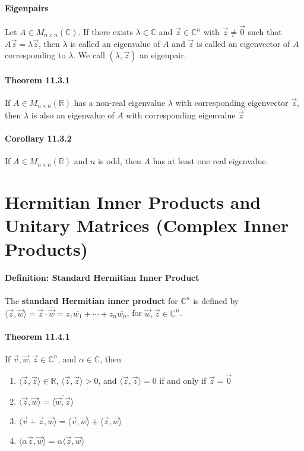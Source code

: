 \documentclass[10pt,letter]{article}
\begin{document}
\paragraph{Eigenpairs}
Let $A\in M_{n\times n}(\mathbb{C})$. If there exists $\lambda\in\mathbb{C}$ and $\vec{z}\in\mathbb{C}^n$ with $\vec{z}\neq\vec{0}$ such that $A\vec{z}=\lambda\vec{z}$, then $\lambda$ is called an eigenvalue of $A$ and $\vec{z}$ is called an eigenvector of $A$ corresponding to $\lambda$. We call $(\lambda,\vec{z})$ an eigenpair. 
\paragraph{Theorem 11.3.1}
If $A\in M_{n\times n}(\mathbb{R})$ has a non-real eigenvalue $\lambda$ with corresponding eigenvector $\vec{z}$, then $\overline{\lambda}$ is also an eigenvalue of $A$ with corresponding eigenvalue $\overline{\vec{z}}$
\paragraph{Corollary 11.3.2}
If $A\in M_{n\times n}(\mathbb{R})$ and $n$ is odd, then $A$ has at least one real eigenvalue.


\section*{Hermitian Inner Products and Unitary Matrices (Complex Inner Products)}
\paragraph{Definition: Standard Hermitian Inner Product}
The \textbf{standard Hermitian inner product} for $\mathbb{C}^n$ is defined by $\langle\vec{z},\vec{w}\rangle=\vec{z}\cdot\overline{\vec{w}}=z_1\overline{w_1}+\cdots+z_n\overline{w_n}$, for $\vec{w},\vec{z}\in\mathbb{C}^n$. 
\paragraph{Theorem 11.4.1}
If $\vec{v},\vec{w},\vec{z}\in\mathbb{C}^n$, and $\alpha\in\mathbb{C}$, then 
\begin{enumerate}
    \item $\langle\vec{z},\vec{z}\rangle\in\mathbb{R}$, $\langle\vec{z},\vec{z}\rangle>0$, and $\langle\vec{z},\vec{z}\rangle=0$ if and only if $\vec{z}=\vec{0}$
    \item $\langle\vec{z},\vec{w}\rangle=\overline{\langle\vec{w},\vec{z}\rangle}$ 
    \item $\langle\vec{v}+\vec{z},\vec{w}\rangle=\langle\vec{v},\vec{w}\rangle+\langle\vec{z},\vec{w}\rangle$
    \item $\langle\alpha\vec{z},\vec{w}\rangle=\alpha\langle\vec{z},\vec{w}\rangle$
\end{enumerate} 
\end{document}
